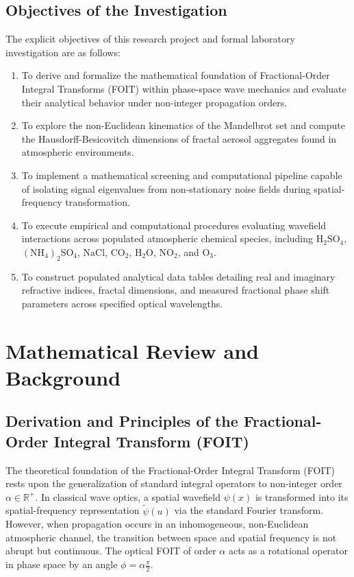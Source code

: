 \documentclass{article}
\begin{document}
\subsection{Objectives of the Investigation}
The explicit objectives of this research project and formal laboratory investigation are as follows:
\begin{enumerate}
    \item To derive and formalize the mathematical foundation of Fractional-Order Integral Transforms (FOIT) within phase-space wave mechanics and evaluate their analytical behavior under non-integer propagation orders.
    \item To explore the non-Euclidean kinematics of the Mandelbrot set and compute the Hausdorff-Besicovitch dimensions of fractal aerosol aggregates found in atmospheric environments.
    \item To implement a mathematical screening and computational pipeline capable of isolating signal eigenvalues from non-stationary noise fields during spatial-frequency transformation.
    \item To execute empirical and computational procedures evaluating wavefield interactions across populated atmospheric chemical species, including $\text{H}_2\text{SO}_4$, $(\text{NH}_4)_2\text{SO}_4$, $\text{NaCl}$, $\text{CO}_2$, $\text{H}_2\text{O}$, $\text{NO}_2$, and $\text{O}_3$.
    \item To construct populated analytical data tables detailing real and imaginary refractive indices, fractal dimensions, and measured fractional phase shift parameters across specified optical wavelengths.
\end{enumerate}

\newpage

\section{Mathematical Review and Background}

\subsection{Derivation and Principles of the Fractional-Order Integral Transform (FOIT)}

The theoretical foundation of the Fractional-Order Integral Transform (FOIT) rests upon the generalization of standard integral operators to non-integer order $\alpha \in \mathbb{R}^+$. In classical wave optics, a spatial wavefield $\psi(x)$ is transformed into its spatial-frequency representation $\tilde{\psi}(u)$ via the standard Fourier transform. However, when propagation occurs in an inhomogeneous, non-Euclidean atmospheric channel, the transition between space and spatial frequency is not abrupt but continuous. The optical FOIT of order $\alpha$ acts as a rotational operator in phase space by an angle $\phi = \alpha \frac{\pi}{2}$.
\end{document}
